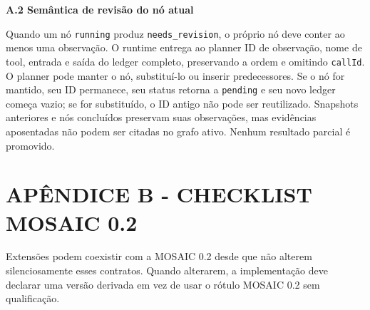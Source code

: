 \documentclass[12pt,a4paper]{article}
\begin{document}
\textbf{A.2 Semântica de revisão do nó atual}


Quando um nó \texttt{running} produz \texttt{needs\_revision}, o próprio nó deve conter ao menos uma observação. O runtime entrega ao planner ID de observação, nome de tool, entrada e saída do ledger completo, preservando a ordem e omitindo \texttt{callId}. O planner pode manter o nó, substituí-lo ou inserir predecessores. Se o nó for mantido, seu ID permanece, seu status retorna a \texttt{pending} e seu novo ledger começa vazio; se for substituído, o ID antigo não pode ser reutilizado. Snapshots anteriores e nós concluídos preservam suas observações, mas evidências aposentadas não podem ser citadas no grafo ativo. Nenhum resultado parcial é promovido.



\section*{APÊNDICE B - CHECKLIST MOSAIC 0.2}



Extensões podem coexistir com a MOSAIC 0.2 desde que não alterem silenciosamente esses contratos. Quando alterarem, a implementação deve declarar uma versão derivada em vez de usar o rótulo MOSAIC 0.2 sem qualificação.
\end{document}

